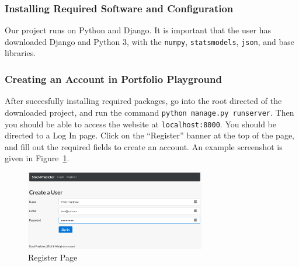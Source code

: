 \documentclass{article}
\begin{document}
\subsubsection{Installing Required Software and Configuration}
Our project runs on Python and Django. It is important that the user has downloaded Django and Python 3, with the \texttt{numpy}, \texttt{statsmodels}, \texttt{json}, and base libraries.

\subsubsection{Creating an Account in Portfolio Playground}
After succesfully installing required packages, go into the root directed of the downloaded project, and run the command \texttt{python manage.py runserver}. Then you should be able to access the website at \texttt{localhost:8000}. You should be directed to a Log In page.  Click on the ``Register'' banner at the top of the page, and fill out the required fields to create an account. An example screenshot is given in Figure~\ref{fig:register}.

\begin{figure}[H]
\begin{center}
\includegraphics[width=0.7\textwidth]{register}
\caption{\label{fig:register} Register Page}
\end{center}
\end{figure}
\end{document}
